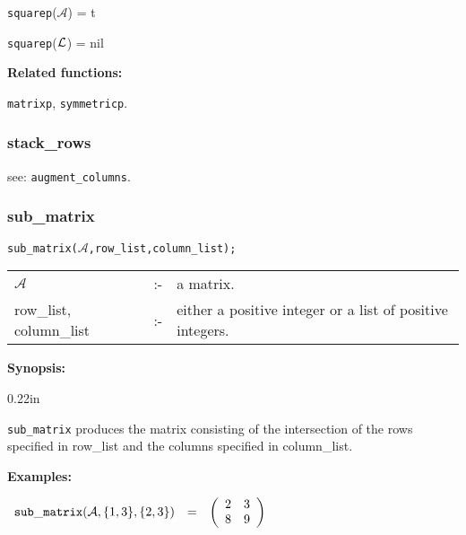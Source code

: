 \vspace*{0.1in}

\hspace*{0.175in} {\tt squarep}($\mathcal{A}$) = t 

\hspace*{0.175in} {\tt squarep}(${\cal L}$) = nil

{\bf Related functions:}

\hspace*{0.175in} {\tt matrixp}, {\tt symmetricp}.


\subsubsection{stack\_rows}
\label{linalg:stack_rows}
\hspace*{0.175in} see: {\tt augment\_columns}.


\subsubsection{sub\_matrix}
\label{linalg:sub_matrix}

\hspace*{0.175in} {\tt sub\_matrix($\mathcal{A}$,row\_list,column\_list);}

\hspace*{0.1in}  
\begin{tabular}{l l l} 
$\mathcal{A}$              &:-& a matrix. \\
row\_list, column\_list &:-& \parbox[t]{.605\linewidth}{either a 
positive integer or a list of positive integers.}
\end{tabular}

{\bf Synopsis:} %


\begin{addtolength}{\leftskip}{0.22in}

{\tt sub\_matrix} produces the matrix consisting of the
              intersection of the rows specified in row\_list and the 
columns specified in column\_list. 

\end{addtolength}

{\bf Examples:}

\begin{flushleft}  
\hspace*{0.1in}
\begin{math}  
\begin{array}{ccc}
{\tt sub\_matrix}(\mathcal{A},\{1,3\},\{2,3\}) & = & 
        \left( \begin{array}{cc} 2 & 3 \\ 8 & 9
 \end{array} \right) 
\end{array}
\end{math}  
\end{flushleft}

